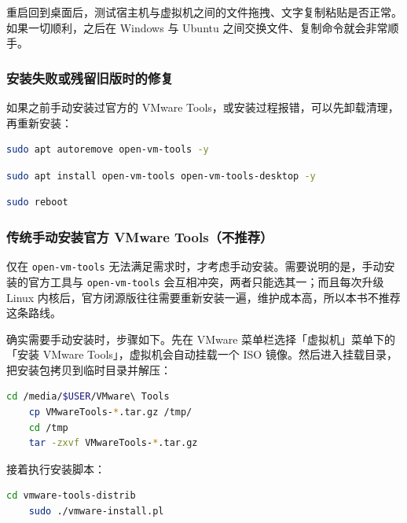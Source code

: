 \documentclass[12pt,a4paper]{ctexbook}
\begin{document}
重启回到桌面后，测试宿主机与虚拟机之间的文件拖拽、文字复制粘贴是否正常。如果一切顺利，之后在 Windows 与 Ubuntu 之间交换文件、复制命令就会非常顺手。

\subsubsection{安装失败或残留旧版时的修复}

如果之前手动安装过官方的 VMware Tools，或安装过程报错，可以先卸载清理，再重新安装：

\begin{lstlisting}[language=bash,title={卸载原有组件并清理}]
    sudo apt autoremove open-vm-tools -y
\end{lstlisting}

\begin{lstlisting}[language=bash,title={重新安装}]
    sudo apt install open-vm-tools open-vm-tools-desktop -y
\end{lstlisting}

\begin{lstlisting}[language=bash,title={重启生效}]
    sudo reboot
\end{lstlisting}

\subsubsection{传统手动安装官方 VMware Tools（不推荐）}

仅在 \texttt{open-vm-tools} 无法满足需求时，才考虑手动安装。需要说明的是，手动安装的官方工具与 \texttt{open-vm-tools} 会互相冲突，两者只能选其一；而且每次升级 Linux 内核后，官方闭源版往往需要重新安装一遍，维护成本高，所以本书不推荐这条路线。

确实需要手动安装时，步骤如下。先在 VMware 菜单栏选择「虚拟机」菜单下的「安装 VMware Tools」，虚拟机会自动挂载一个 ISO 镜像。然后进入挂载目录，把安装包拷贝到临时目录并解压：

\begin{lstlisting}[language=bash,title={拷贝安装包并解压}]
    cd /media/$USER/VMware\ Tools
    cp VMwareTools-*.tar.gz /tmp/
    cd /tmp
    tar -zxvf VMwareTools-*.tar.gz
\end{lstlisting}

接着执行安装脚本：

\begin{lstlisting}[language=bash,title={运行安装脚本}]
    cd vmware-tools-distrib
    sudo ./vmware-install.pl
\end{lstlisting}
\end{document}
